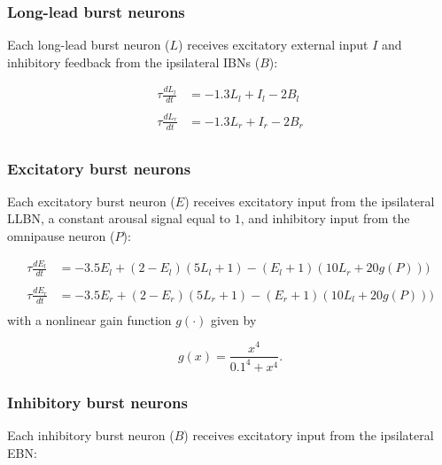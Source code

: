 \documentclass[10pt,a4paper,onecolumn]{article}
\begin{document}
\subsubsection{Long-lead burst neurons}\label{long-lead-burst-neurons}

Each long-lead burst neuron (\(L\)) receives excitatory external input
\(I\) and inhibitory feedback from the ipsilateral IBNs (\(B\)):

\begin{equation}
\begin{array}{ll}
\tau\frac{dL_l}{dt} &= -1.3L_l+I_l-2B_l \\\\
\tau\frac{dL_r}{dt} &= -1.3L_r+I_r-2B_r \\
\end{array}
\label{eq:llbn}\end{equation}

\subsubsection{Excitatory burst neurons}\label{excitatory-burst-neurons}

Each excitatory burst neuron (\(E\)) receives excitatory input from the
ipsilateral LLBN, a constant arousal signal equal to \(1\), and
inhibitory input from the omnipause neuron (\(P\)):

\begin{equation}
\begin{array}{ll}
\tau\frac{dE_l}{dt} &= -3.5E_l+(2-E_l)(5L_l+1)-(E_l+1)(10L_r+20g(P))) \\\\
\tau\frac{dE_r}{dt} &= -3.5E_r+(2-E_r)(5L_r+1)-(E_r+1)(10L_l+20g(P))) \\
\end{array}
\label{eq:ebn}\end{equation} with a nonlinear gain function \(g(\cdot)\)
given by

\begin{equation}
g(x) = \frac{x^4}{0.1^4+x^4} \textrm{.}
\label{eq:gain}\end{equation}

\subsubsection{Inhibitory burst neurons}\label{inhibitory-burst-neurons}

Each inhibitory burst neuron (\(B\)) receives excitatory input from the
ipsilateral EBN:
\end{document}
